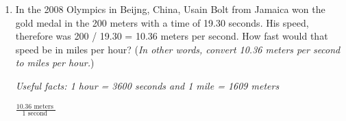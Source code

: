 \documentclass[12pt]{article}
\begin{document}
\begin{enumerate}
\noindent \hrulefill


\item In the 2008 Olympics in Beijng, China, Usain Bolt from Jamaica won the gold medal in the 200 meters with a time of 19.30 seconds.  His speed, therefore was 200 / 19.30 = 10.36 meters per second.  How fast would that speed be in miles per hour? (\emph{In other words, convert 10.36 meters per second to miles per hour.})

\emph{Useful facts:  1 hour = 3600 seconds and 1 mile = 1609 meters}\vfill

$ \displaystyle \frac{ 10.36 \mbox{ meters } }{1 \mbox{ second } }$
\vfill




\end{enumerate}



\end{document}
